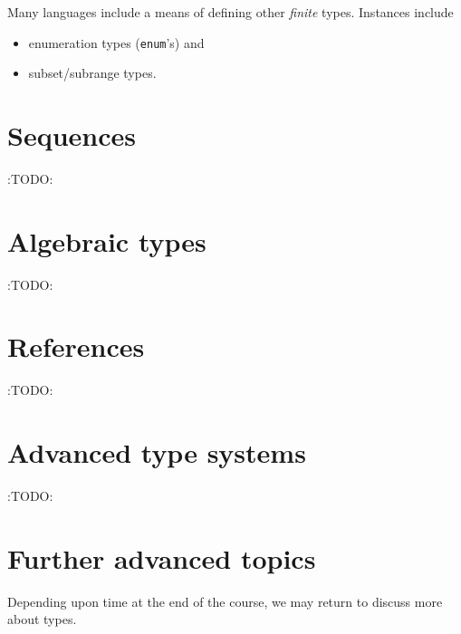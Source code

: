 \documentclass[11pt]{article}
\theoremstyle{definition}
\begin{document}
Many languages include a means of defining other \emph{finite} types.
Instances include
\begin{itemize}
\item enumeration types (\texttt{enum}'s) and
\item subset/subrange types.
\end{itemize}

\section{Sequences}
\label{sec:org7e8f841}

:TODO:

\section{Algebraic types}
\label{sec:org242f44b}

:TODO:

\section{References}
\label{sec:orge9136ec}

:TODO:

\section{Advanced type systems}
\label{sec:orgff14d16}

:TODO:

\section{Further advanced topics}
\label{sec:org2deb098}

Depending upon time at the end of the course,
we may return to discuss more about types.
\end{document}
